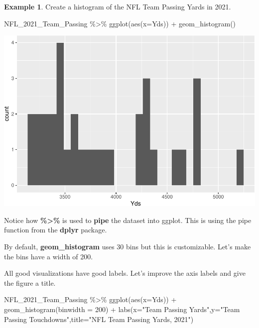 \documentclass[
]{book}
\newenvironment{Shaded}{\begin{snugshade}}{\end{snugshade}}
\newcommand{\AttributeTok}[1]{\textcolor[rgb]{0.77,0.63,0.00}{#1}}
\newcommand{\DecValTok}[1]{\textcolor[rgb]{0.00,0.00,0.81}{#1}}
\newcommand{\FunctionTok}[1]{\textcolor[rgb]{0.00,0.00,0.00}{#1}}
\newcommand{\NormalTok}[1]{#1}
\newcommand{\SpecialCharTok}[1]{\textcolor[rgb]{0.00,0.00,0.00}{#1}}
\newcommand{\StringTok}[1]{\textcolor[rgb]{0.31,0.60,0.02}{#1}}
\theoremstyle{definition}
\theoremstyle{definition}
\newtheorem{example}{Example}[chapter]
\theoremstyle{definition}
\theoremstyle{definition}
\theoremstyle{remark}
\begin{document}
\begin{example}
Create a histogram of the NFL Team Passing Yards in 2021.

\begin{Shaded}
\begin{Highlighting}[]
\NormalTok{NFL\_2021\_Team\_Passing }\SpecialCharTok{\%\textgreater{}\%} \FunctionTok{ggplot}\NormalTok{(}\FunctionTok{aes}\NormalTok{(}\AttributeTok{x=}\NormalTok{Yds)) }\SpecialCharTok{+} \FunctionTok{geom\_histogram}\NormalTok{()}
\end{Highlighting}
\end{Shaded}

\includegraphics{series_files/figure-latex/hist-1.pdf}

Notice how \textbf{\%\textgreater\%} is used to \textbf{pipe} the dataset into ggplot. This is using the pipe function from the \textbf{dplyr} package.

By default, \textbf{geom\_histogram} uses 30 bins but this is customizable. Let's make the bins have a width of 200.

All good visualizations have good labels. Let's improve the axis labels and give the figure a title.

\begin{Shaded}
\begin{Highlighting}[]
\NormalTok{NFL\_2021\_Team\_Passing }\SpecialCharTok{\%\textgreater{}\%} \FunctionTok{ggplot}\NormalTok{(}\FunctionTok{aes}\NormalTok{(}\AttributeTok{x=}\NormalTok{Yds)) }\SpecialCharTok{+} 
  \FunctionTok{geom\_histogram}\NormalTok{(}\AttributeTok{binwidth =} \DecValTok{200}\NormalTok{) }\SpecialCharTok{+}
  \FunctionTok{labs}\NormalTok{(}\AttributeTok{x=}\StringTok{"Team Passing Yards"}\NormalTok{,}\AttributeTok{y=}\StringTok{"Team Passing Touchdowns"}\NormalTok{,}\AttributeTok{title=}\StringTok{"NFL Team Passing Yards, 2021"}\NormalTok{)}
\end{Highlighting}
\end{Shaded}


\end{example}
\end{document}
